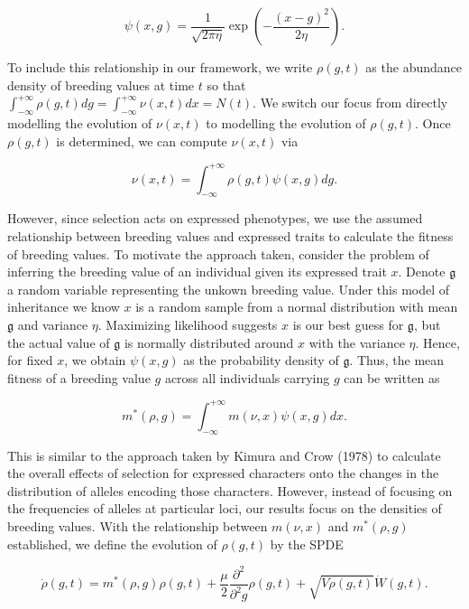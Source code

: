 \documentclass[]{elsarticle} %
\begin{document}
\begin{equation}
\psi(x,g)=\frac{1}{\sqrt{2\pi\eta}}\exp\left(-\frac{(x-g)^2}{2\eta}\right).
\end{equation}

To include this relationship in our framework, we write \(\rho(g,t)\) as
the abundance density of breeding values at time \(t\) so that
\(\int_{-\infty}^{+\infty}\rho(g,t)dg=\int_{-\infty}^{+\infty}\nu(x,t)dx=N(t)\).
We switch our focus from directly modelling the evolution of
\(\nu(x,t)\) to modelling the evolution of \(\rho(g,t)\). Once
\(\rho(g,t)\) is determined, we can compute \(\nu(x,t)\) via

\begin{equation}\label{nu_from_rho}
\nu(x,t)=\int_{-\infty}^{+\infty}\rho(g,t)\psi(x,g)dg.
\end{equation}

However, since selection acts on expressed phenotypes, we use the
assumed relationship between breeding values and expressed traits to
calculate the fitness of breeding values. To motivate the approach
taken, consider the problem of inferring the breeding value of an
individual given its expressed trait \(x\). Denote \(\mathfrak{g}\) a
random variable representing the unkown breeding value. Under this model
of inheritance we know \(x\) is a random sample from a normal
distribution with mean \(\mathfrak{g}\) and variance \(\eta\).
Maximizing likelihood suggests \(x\) is our best guess for
\(\mathfrak{g}\), but the actual value of \(\mathfrak{g}\) is normally
distributed around \(x\) with the variance \(\eta\). Hence, for fixed
\(x\), we obtain \(\psi(x,g)\) as the probability density of
\(\mathfrak{g}\). Thus, the mean fitness of a breeding value \(g\)
across all individuals carrying \(g\) can be written as

\begin{equation}\label{m_rel}
m^*(\rho,g)=\int_{-\infty}^{+\infty}m(\nu,x)\psi(x,g)dx.
\end{equation}

This is similar to the approach taken by Kimura and Crow (1978) to
calculate the overall effects of selection for expressed characters onto
the changes in the distribution of alleles encoding those characters.
However, instead of focusing on the frequencies of alleles at particular
loci, our results focus on the densities of breeding values. With the
relationship between \(m(\nu,x)\) and \(m^*(\rho,g)\) established, we
define the evolution of \(\rho(g,t)\) by the SPDE

\begin{equation}\label{rho_SPDE}
\dot\rho(g,t)=m^*(\rho,g)\rho(g,t)+\frac{\mu}{2}\frac{\partial^2}{\partial^2 g}\rho(g,t)+\sqrt{V\rho(g,t)}\dot W(g,t).
\end{equation}
\end{document}
